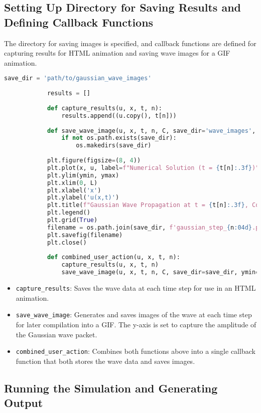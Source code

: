 \documentclass{article}
\begin{document}
		 \subsection{Setting Up Directory for Saving Results and Defining Callback Functions}
		 
		 The directory for saving images is specified, and callback functions are defined for capturing results for HTML animation and saving wave images for a GIF animation.
		 
		 \begin{lstlisting}[language=Python]
		 	save_dir = 'path/to/gaussian_wave_images'
		 	
		 	results = []
		 	
		 	def capture_results(u, x, t, n):
		 		results.append((u.copy(), t[n]))
		 	
		 	def save_wave_image(u, x, t, n, C, save_dir='wave_images', ymin=-0.6, ymax=0.7):
			 	if not os.path.exists(save_dir):
			 		os.makedirs(save_dir)
		 	
		 	plt.figure(figsize=(8, 4))
		 	plt.plot(x, u, label=f"Numerical Solution (t = {t[n]:.3f})", color="blue")
		 	plt.ylim(ymin, ymax)
		 	plt.xlim(0, L)
		 	plt.xlabel('x')
		 	plt.ylabel('u(x,t)')
		 	plt.title(f"Gaussian Wave Propagation at t = {t[n]:.3f}, Courant number = {C}")
		 	plt.legend()
		 	plt.grid(True)
		 	filename = os.path.join(save_dir, f'gaussian_step_{n:04d}.png')
		 	plt.savefig(filename)
		 	plt.close()
		 	
		 	def combined_user_action(u, x, t, n):
			 	capture_results(u, x, t, n)
			 	save_wave_image(u, x, t, n, C, save_dir=save_dir, ymin=-0.6, ymax=0.7)
		 \end{lstlisting}
		 
		 \begin{itemize}
		 	\item \texttt{capture\_results}: Saves the wave data at each time step for use in an HTML animation.
		 	\item \texttt{save\_wave\_image}: Generates and saves images of the wave at each time step for later compilation into a GIF. The y-axis is set to capture the amplitude of the Gaussian wave packet.
		 	\item \texttt{combined\_user\_action}: Combines both functions above into a single callback function that both stores the wave data and saves images.
		 \end{itemize}
		 
		 \subsection{Running the Simulation and Generating Output}
		 
\end{document}
